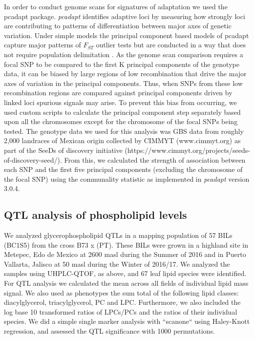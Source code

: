 \documentclass[9pt,twocolumn,twoside,lineno]{BioRxiv}
\begin{document}
In order to conduct genome scans for signatures of adaptation we used the pcadapt \cite{Luu2017-ws} package.
\textit{pcadapt} identifies adaptive loci by measuring how strongly loci are contributing to patterns of differentiation between major axes of genetic variation.
Under simple models the principal component based models of pcadapt capture major patterns of $F_{ST}$ outlier tests but are conducted in a way that does not require population delimitation \cite{duforet2014genome}.
As the genome scan comparison requires a focal SNP to be compared to the first K principal components of the genotype data, it can be biased by large regions of low recombination that drive the major axes of variation in the principal components.
Thus, when SNPs from these low recombination regions are compared against principal components driven by linked loci spurious signals may arise.
To prevent this bias from occurring, we used custom scripts to calculate the principal component step separately based upon all the chromosomes except for the chromosome of the focal SNPs being tested.
The genotype data we used for this analysis was GBS data from roughly 2,000 landraces of Mexican origin collected by CIMMYT (www.cimmyt.org) as part of the SeeDs of discovery initiative (https://www.cimmyt.org/projects/seeds-of-discovery-seed/).
From this, we calculated the strength of association between each SNP and the first five principal components (excluding the chromosome of the focal SNP) using the communality statistic as implemented in \textit{pcadapt} version 3.0.4.

\subsection{QTL analysis of phospholipid levels}
We analyzed glycerophospholipid QTLs in a mapping population of 57 BILs (BC1S5) from the cross B73 x (PT).
These BILs were grown in a highland site in Metepec, Edo de Mexico at 2600 masl during the Summer of 2016 and in Puerto Vallarta, Jalisco at 50 masl during the Winter of 2016/17. 
We analyzed the samples using UHPLC-QTOF, as above, and 67 leaf lipid species were identified.
For QTL analysis we calculated the mean across all fields of individual lipid mass signal. 
We also used as phenotypes the sum total of the following lipid classes: diacylglycerol, triacylglycerol, PC and  LPC.  
Furthermore,  we also included the log base 10 transformed ratios of LPCs/PCs and the ratios of their individual species. 
We did a simple single marker analysis  with ``scanone`` using Haley-Knott  regression, and assessed the QTL significance with 1000 permutations.
\end{document}
